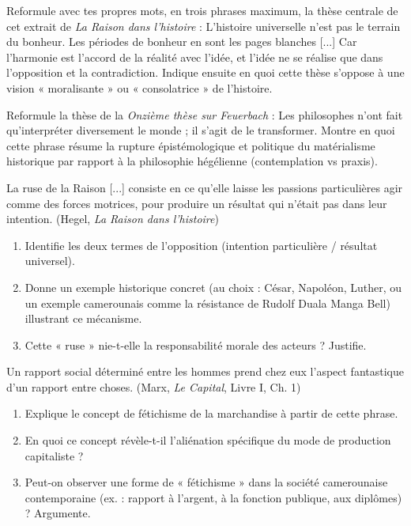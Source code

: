\documentclass[11pt]{article}
\newcommand{\cle}[1]{{\popxbold\color{popdark}#1}}
\newcounter{popsec}
\newcounter{popsub}
\newcommand{\courssub}[1]{%
  \stepcounter{popsub}%
  \par\vspace{9pt}\noindent{\popxbold\fontsize{11.5}{13}\selectfont\color{popink}{\color{poporange}\thepopsec.\thepopsub}\hspace{6pt}#1}\par\nopagebreak\vspace{4pt}
}
\begin{document}
\courssub{Je m'entraîne}

\begin{exercice}
Reformule avec tes propres mots, en trois phrases maximum, la thèse centrale de cet extrait de \emph{La Raison dans l'histoire} :
\guillemotleft L'histoire universelle n'est pas le terrain du bonheur. Les périodes de bonheur en sont les pages blanches [...] Car l'harmonie est l'accord de la réalité avec l'idée, et l'idée ne se réalise que dans l'opposition et la contradiction. \guillemotright
Indique ensuite en quoi cette thèse s'oppose à une vision « moralisante » ou « consolatrice » de l'histoire.
\end{exercice}

\begin{exercice}
Reformule la thèse de la \emph{Onzième thèse sur Feuerbach} :
\guillemotleft Les philosophes n'ont fait qu'interpréter diversement le monde ; il s'agit de le transformer. \guillemotright
Montre en quoi cette phrase résume la rupture épistémologique et politique du matérialisme historique par rapport à la philosophie hégélienne (contemplation vs praxis).
\end{exercice}

\begin{experience}
\guillemotleft La ruse de la Raison [...] consiste en ce qu'elle laisse les passions particulières agir comme des forces motrices, pour produire un résultat qui n'était pas dans leur intention. \guillemotright (Hegel, \emph{La Raison dans l'histoire})
\begin{enumerate}
\item Identifie les deux termes de l'opposition (intention particulière / résultat universel).
\item Donne un exemple historique concret (au choix : César, Napoléon, Luther, ou un exemple camerounais comme la résistance de Rudolf Duala Manga Bell) illustrant ce mécanisme.
\item Cette « ruse » nie-t-elle la responsabilité morale des acteurs ? Justifie.
\end{enumerate}
\end{experience}

\begin{experience}
\guillemotleft Un rapport social déterminé entre les hommes prend chez eux l'aspect fantastique d'un rapport entre choses. \guillemotright (Marx, \emph{Le Capital}, Livre I, Ch. 1)
\begin{enumerate}
\item Explique le concept de \cle{fétichisme de la marchandise} à partir de cette phrase.
\item En quoi ce concept révèle-t-il l'aliénation spécifique du mode de production capitaliste ?
\item Peut-on observer une forme de « fétichisme » dans la société camerounaise contemporaine (ex. : rapport à l'argent, à la fonction publique, aux diplômes) ? Argumente.
\end{enumerate}
\end{experience}
\end{document}
